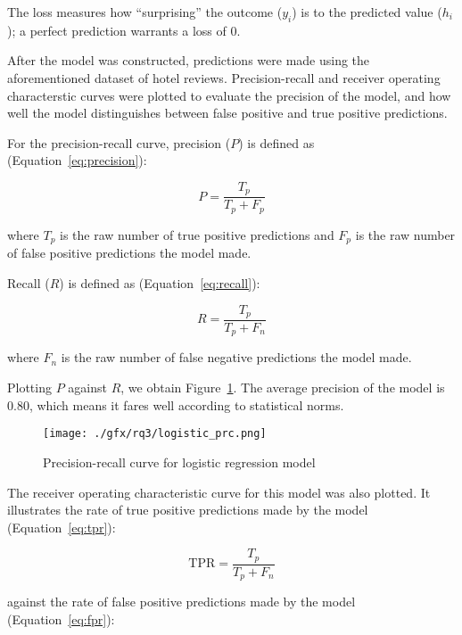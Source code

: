 \documentclass[12pt, a4paper]{pancake-article}
\begin{document}
The loss measures how ``surprising'' the outcome ($y_i$) is to the predicted
value ($h_i$); a perfect prediction warrants a loss of $0$.

After the model was constructed, predictions were made using the aforementioned
dataset of hotel reviews. Precision-recall and receiver operating characterstic curves
were plotted to evaluate the precision of the model,
and how well the model distinguishes between false positive and true positive predictions.

For the precision-recall curve, precision (\(P\)) is defined as (Equation~\ref{eq:precision}):

\begin{equation}
	P = \frac{T_p}{T_p + F_p}
	\label{eq:precision}
\end{equation}

where \(T_p\) is the raw number of true positive predictions
and \(F_p\) is the raw number of false positive predictions the model made.

Recall (\(R\)) is defined as (Equation~\ref{eq:recall}):

\begin{equation}
	R = \frac{T_p}{T_p + F_n}
	\label{eq:recall}
\end{equation}

where \(F_n\) is the raw number of false negative predictions
the model made.

Plotting \(P\) against \(R\), we obtain Figure~\ref{fig:prc-logreg}.
The average precision of the model is \(0.80\), which means it fares well
according to statistical norms.

\begin{figure}
	\begin{center}
		\texttt{[image: ./gfx/rq3/logistic\_prc.png]}
	\end{center}
	\caption{Precision-recall curve for logistic regression model}
	\label{fig:prc-logreg}
\end{figure}

The receiver operating characteristic curve for this model was also plotted.
It illustrates the rate of true positive predictions made by the model (Equation~\ref{eq:tpr}):

\begin{equation}
	\text{TPR} = \frac{T_p}{T_p + F_n}
	\label{eq:tpr}
\end{equation}

against the rate of false positive predictions made by the model (Equation~\ref{eq:fpr}):
\end{document}
